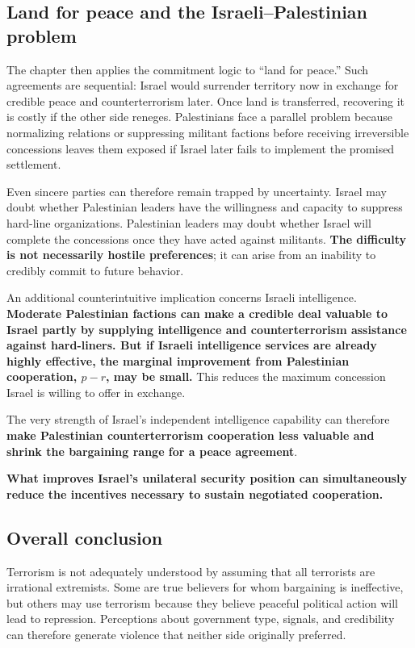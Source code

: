 \subsection{Land for peace and the Israeli--Palestinian problem}

The chapter then applies the commitment logic to ``land for peace.'' Such agreements are sequential: Israel would surrender territory now in exchange for credible peace and counterterrorism later. Once land is transferred, recovering it is costly if the other side reneges. Palestinians face a parallel problem because normalizing relations or suppressing militant factions before receiving irreversible concessions leaves them exposed if Israel later fails to implement the promised settlement.

Even sincere parties can therefore remain trapped by uncertainty. Israel may doubt whether Palestinian leaders have the willingness and capacity to suppress hard-line organizations. Palestinian leaders may doubt whether Israel will complete the concessions once they have acted against militants. \textbf{The difficulty is not necessarily hostile preferences}; it can arise from an inability to credibly commit to future behavior.

An additional counterintuitive implication concerns Israeli intelligence. \textbf{Moderate Palestinian factions can make a credible deal valuable to Israel partly by supplying intelligence and counterterrorism assistance against hard-liners. But if Israeli intelligence services are already highly effective, the marginal improvement from Palestinian cooperation, $p-r$, may be small.} This reduces the maximum concession Israel is willing to offer in exchange.

The very strength of Israel's independent intelligence capability can therefore \textbf{make Palestinian counterterrorism cooperation less valuable and shrink the bargaining range for a peace agreement}.

\textbf{What improves Israel's unilateral security position can simultaneously reduce the incentives necessary to sustain negotiated cooperation.}

\subsection{Overall conclusion}

Terrorism is not adequately understood by assuming that all terrorists are irrational extremists. Some are true believers for whom bargaining is ineffective, but others may use terrorism because they believe peaceful political action will lead to repression. Perceptions about government type, signals, and credibility can therefore generate violence that neither side originally preferred.

